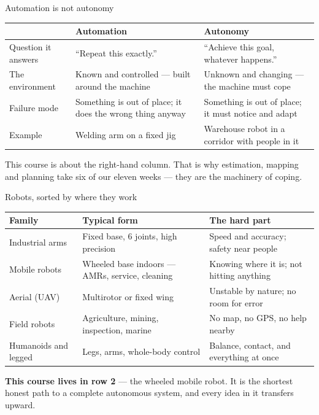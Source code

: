\documentclass[aspectratio=169]{beamer}
\begin{document}
\begin{frame}{Automation is not autonomy}
  \small
  \begin{center}
  \begin{tabular}{@{}p{2.3cm}p{4.4cm}p{4.6cm}@{}}
    \toprule
    & \textbf{Automation} & \textbf{Autonomy} \\
    \midrule
    Question it answers & ``Repeat this exactly.'' & ``Achieve this goal, whatever happens.'' \\[0.3em]
    The environment & Known and controlled --- built around the machine & Unknown and changing --- the machine must cope \\[0.3em]
    Failure mode & Something is out of place; it does the wrong thing anyway & Something is out of place; it must notice and adapt \\[0.3em]
    Example & Welding arm on a fixed jig & Warehouse robot in a corridor with people in it \\
    \bottomrule
  \end{tabular}
  \end{center}

  \vspace{0.6em}
  This course is about the right-hand column. That is why estimation, mapping and planning
  take six of our eleven weeks --- they are the machinery of coping.
\end{frame}

\begin{frame}{Robots, sorted by where they work}
  \small
  \begin{center}
  \begin{tabular}{@{}p{2.4cm}p{4.2cm}p{4.6cm}@{}}
    \toprule
    \textbf{Family} & \textbf{Typical form} & \textbf{The hard part} \\
    \midrule
    Industrial arms & Fixed base, 6 joints, high precision & Speed and accuracy; safety near people \\[0.3em]
    Mobile robots  & Wheeled base indoors --- AMRs, service, cleaning & Knowing where it is; not hitting anything \\[0.3em]
    Aerial (UAV)   & Multirotor or fixed wing & Unstable by nature; no room for error \\[0.3em]
    Field robots   & Agriculture, mining, inspection, marine & No map, no GPS, no help nearby \\[0.3em]
    Humanoids and legged & Legs, arms, whole-body control & Balance, contact, and everything at once \\
    \bottomrule
  \end{tabular}
  \end{center}

  \vspace{0.5em}
  \textbf{This course lives in row 2} --- the wheeled mobile robot. It is the shortest honest
  path to a complete autonomous system, and every idea in it transfers upward.
\end{frame}
\end{document}
